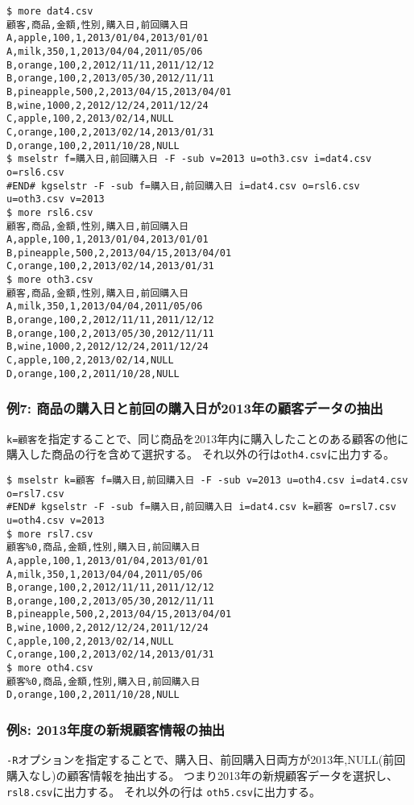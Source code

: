 \begin{Verbatim}[baselinestretch=0.7,frame=single]
$ more dat4.csv
顧客,商品,金額,性別,購入日,前回購入日
A,apple,100,1,2013/01/04,2013/01/01
A,milk,350,1,2013/04/04,2011/05/06
B,orange,100,2,2012/11/11,2011/12/12
B,orange,100,2,2013/05/30,2012/11/11
B,pineapple,500,2,2013/04/15,2013/04/01
B,wine,1000,2,2012/12/24,2011/12/24
C,apple,100,2,2013/02/14,NULL
C,orange,100,2,2013/02/14,2013/01/31
D,orange,100,2,2011/10/28,NULL
$ mselstr f=購入日,前回購入日 -F -sub v=2013 u=oth3.csv i=dat4.csv o=rsl6.csv
#END# kgselstr -F -sub f=購入日,前回購入日 i=dat4.csv o=rsl6.csv u=oth3.csv v=2013
$ more rsl6.csv
顧客,商品,金額,性別,購入日,前回購入日
A,apple,100,1,2013/01/04,2013/01/01
B,pineapple,500,2,2013/04/15,2013/04/01
C,orange,100,2,2013/02/14,2013/01/31
$ more oth3.csv
顧客,商品,金額,性別,購入日,前回購入日
A,milk,350,1,2013/04/04,2011/05/06
B,orange,100,2,2012/11/11,2011/12/12
B,orange,100,2,2013/05/30,2012/11/11
B,wine,1000,2,2012/12/24,2011/12/24
C,apple,100,2,2013/02/14,NULL
D,orange,100,2,2011/10/28,NULL
\end{Verbatim}
\subsubsection*{例7: 商品の購入日と前回の購入日が2013年の顧客データの抽出}

\verb|k=顧客|を指定することで、同じ商品を2013年内に購入したことのある顧客の他に購入した商品の行を含めて選択する。
それ以外の行は\verb|oth4.csv|に出力する。


\begin{Verbatim}[baselinestretch=0.7,frame=single]
$ mselstr k=顧客 f=購入日,前回購入日 -F -sub v=2013 u=oth4.csv i=dat4.csv o=rsl7.csv
#END# kgselstr -F -sub f=購入日,前回購入日 i=dat4.csv k=顧客 o=rsl7.csv u=oth4.csv v=2013
$ more rsl7.csv
顧客%0,商品,金額,性別,購入日,前回購入日
A,apple,100,1,2013/01/04,2013/01/01
A,milk,350,1,2013/04/04,2011/05/06
B,orange,100,2,2012/11/11,2011/12/12
B,orange,100,2,2013/05/30,2012/11/11
B,pineapple,500,2,2013/04/15,2013/04/01
B,wine,1000,2,2012/12/24,2011/12/24
C,apple,100,2,2013/02/14,NULL
C,orange,100,2,2013/02/14,2013/01/31
$ more oth4.csv
顧客%0,商品,金額,性別,購入日,前回購入日
D,orange,100,2,2011/10/28,NULL
\end{Verbatim}
\subsubsection*{例8: 2013年度の新規顧客情報の抽出}

\verb|-R|オプションを指定することで、購入日、前回購入日両方が2013年,NULL(前回購入なし)の顧客情報を抽出する。
つまり2013年の新規顧客データを選択し、\verb|rsl8.csv|に出力する。
それ以外の行は \verb|oth5.csv|に出力する。


